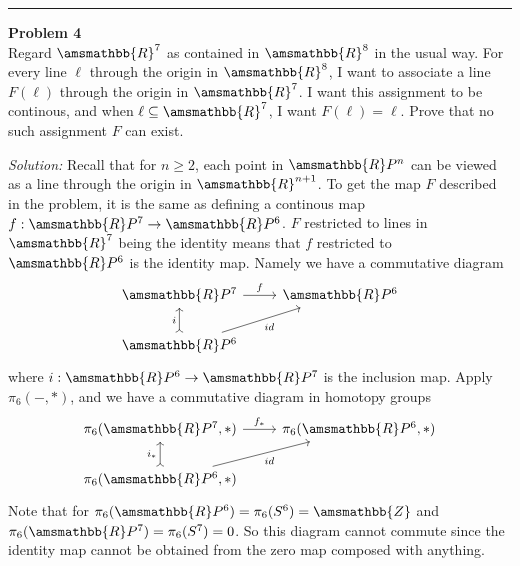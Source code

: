 \documentclass[letterpaper, 12pt]{article}
\newenvironment{problem}[2][Problem]
		{ \begin{mdframed}[backgroundcolor=gray!20] \textbf{#1 #2} \\}
		{  \end{mdframed}}
\newenvironment{solution}
		{\textit{Solution:}}
		{}
\renewcommand{\mathbb}{\amsmathbb}
\begin{document}
\noindent\rule{7in}{2.8pt}
\begin{problem}{4}
Regard \(\mathbb{R}^7\) as contained in \(\mathbb{R}^8\) in the usual way. For every line \(\ell\) through the origin in \(\mathbb{R}^8\), I want to associate a line \(F(\ell)\) through the origin in \(\mathbb{R}^7\). 
I want this assignment to be continous, and when \(\ell\subseteq \mathbb{R}^7\), I want \(F(\ell)=\ell\). Prove that no such assignment \(F\) can exist.
\end{problem}
\begin{solution}
Recall that for \(n\geq 2\), each point in \(\mathbb{R}P^n\) can be viewed as a line through the origin in \(\mathbb{R}^{n+1}\). To get the map \(F\) described in the problem, it is the same as defining a continous map \(f:\mathbb{R}P^7\rightarrow \mathbb{R}P^6\). \(F\) restricted to 
lines in \(\mathbb{R}^7\) being the identity means that \(f\) restricted to \(\mathbb{R}P^6\) is the identity map. Namely we have a commutative diagram 
\[\begin{tikzcd}
	{\mathbb{R}P^7} & {\mathbb{R}P^6} \\
	{\mathbb{R}P^6}
	\arrow["f", from=1-1, to=1-2]
	\arrow["i", tail, from=2-1, to=1-1]
	\arrow["id"', from=2-1, to=1-2]
\end{tikzcd}\]
where \(i:\mathbb{R}P^6\rightarrow \mathbb{R}P^7\) is the inclusion map. Apply \(\pi_6(-,*)\), and we have a commutative diagram in homotopy groups 
\[\begin{tikzcd}
	{\pi_6(\mathbb{R}P^7,*)} & {\pi_6(\mathbb{R}P^6,*)} \\
	{\pi_6(\mathbb{R}P^6,*)}
	\arrow["{f_*}", from=1-1, to=1-2]
	\arrow["{i_*}", tail, from=2-1, to=1-1]
	\arrow["id"', from=2-1, to=1-2]
\end{tikzcd}\]
Note that for \(\pi_6(\mathbb{R}P^6)=\pi_6(S^6)=\mathbb{Z}\) and \(\pi_6(\mathbb{R}P^7)=\pi_6(S^7)=0\). So this diagram cannot commute since the identity map cannot be obtained from the zero map 
composed with anything.
\end{solution}
\end{document}
